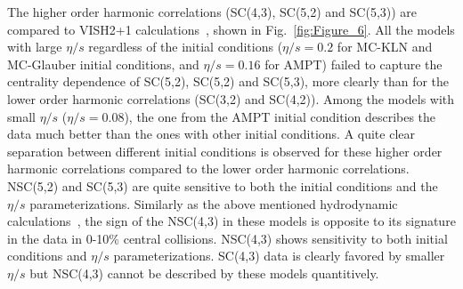 The higher order harmonic correlations (SC(4,3), SC(5,2) and SC(5,3)) are compared to VISH2+1 calculations~\cite{Zhu:2016puf}, shown in Fig.~\ref{fig:Figure_6}. 
All the models with large $\eta/s$ regardless of the initial conditions ($\eta/s=0.2$ for MC-KLN and MC-Glauber initial conditions, and $\eta/s=0.16$ for AMPT) failed to capture the centrality dependence of SC(5,2), SC(5,2) and SC(5,3), more clearly than for the lower order harmonic correlations (SC(3,2) and SC(4,2)).
Among the models with small $\eta/s$ ($\eta/s=0.08$), the one from the AMPT initial condition describes the data much better than the ones with other initial conditions. 
A quite clear separation between different initial conditions is observed for these higher order harmonic correlations compared to the lower order harmonic correlations.
NSC(5,2) and SC(5,3) are quite sensitive to both the initial conditions and the $\eta/s$ parameterizations.
Similarly as the above mentioned hydrodynamic calculations~\cite{Niemi:2015qia}, the sign of the NSC(4,3) in these models is opposite to its signature in the data in 0-10\% central collisions. NSC(4,3) shows sensitivity to both initial conditions and $\eta/s$ parameterizations.
SC(4,3) data is clearly favored by smaller $\eta/s$ but NSC(4,3) cannot be described by these models quantitively.
     
